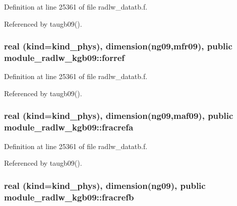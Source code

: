 Definition at line 25361 of file radlw\+\_\+datatb.\+f.



Referenced by taugb09().

\subsubsection[{\texorpdfstring{forref}{forref}}]{\setlength{\rightskip}{0pt plus 5cm}real (kind=kind\+\_\+phys), dimension(ng09,{\bf mfr09}), public module\+\_\+radlw\+\_\+kgb09\+::forref}\hypertarget{namespacemodule__radlw__kgb09_a72a8c0879636dba20e2a8a35ba79f681}{}\label{namespacemodule__radlw__kgb09_a72a8c0879636dba20e2a8a35ba79f681}


Definition at line 25361 of file radlw\+\_\+datatb.\+f.



Referenced by taugb09().

\subsubsection[{\texorpdfstring{fracrefa}{fracrefa}}]{\setlength{\rightskip}{0pt plus 5cm}real (kind=kind\+\_\+phys), dimension(ng09,{\bf maf09}), public module\+\_\+radlw\+\_\+kgb09\+::fracrefa}\hypertarget{namespacemodule__radlw__kgb09_ace3d3e2731609f7ea50eb798bd212f3b}{}\label{namespacemodule__radlw__kgb09_ace3d3e2731609f7ea50eb798bd212f3b}


Definition at line 25361 of file radlw\+\_\+datatb.\+f.



Referenced by taugb09().

\subsubsection[{\texorpdfstring{fracrefb}{fracrefb}}]{\setlength{\rightskip}{0pt plus 5cm}real (kind=kind\+\_\+phys), dimension(ng09), public module\+\_\+radlw\+\_\+kgb09\+::fracrefb}\hypertarget{namespacemodule__radlw__kgb09_a26476f00fe13c1c81d3ae0cf8e43c90b}{}\label{namespacemodule__radlw__kgb09_a26476f00fe13c1c81d3ae0cf8e43c90b}


